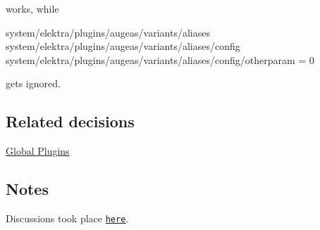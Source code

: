 works, while


\begin{DoxyCode}
system/elektra/plugins/augeas/variants/aliases
system/elektra/plugins/augeas/variants/aliases/config
system/elektra/plugins/augeas/variants/aliases/config/otherparam = 0
\end{DoxyCode}


gets ignored.

\subsection*{Related decisions}


\begin{DoxyItemize}
\item \hyperlink{doc_decisions_global_plugins_md}{Global Plugins}
\end{DoxyItemize}

\subsection*{Notes}

Discussions took place \href{https://git.libelektra.org/issues/1006}{\tt here}. 
